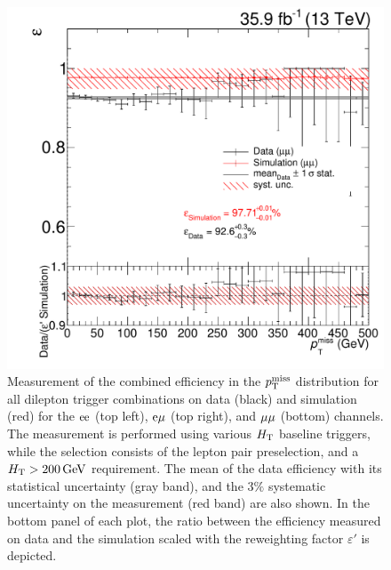 \begin{figure}[htb]
 \includegraphics[width=\pairwidth]{figures/triggerStudies/efficiency_dataHT_trigDilep_ptcuts_MM_met}
 \caption{Measurement of the combined efficiency in the $p_{\mathrm{T}}^\text{miss}$ distribution for all dilepton trigger combinations on data (black) and simulation (red) for the $\mathrm{e}\mathrm{e}$ (top left), $\mathrm{e}\mu$ (top right), and $\mu\mu$ (bottom) channels. The measurement is performed using various $H_{\mathrm{T}}$ baseline triggers, while the selection consists of the lepton pair preselection, and a $H_{\mathrm{T}}>200\,\text{Ge\hspace{-.08em}V}$ requirement. The mean of the data efficiency with its statistical uncertainty (gray band), and the $3\%$ systematic uncertainty on the measurement (red band) are also shown. In the bottom panel of each plot, the ratio between the efficiency measured on data and the simulation scaled with the reweighting factor $\varepsilon'$ is depicted.}
 \label{fig:app_triggEff2}
\end{figure}

